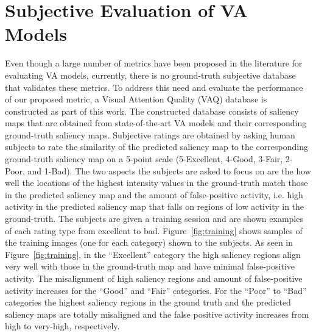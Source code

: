 \documentclass[12pt,onecolumn,journal,	draftclsnofoot]{IEEEtran}
\begin{document}
\section{Subjective Evaluation of VA Models}
\label{sec:subjectivestudy}
Even though a large number of metrics have been proposed in the literature for evaluating VA models, currently, there is no ground-truth subjective database that validates these metrics.  To address this need and evaluate the performance of our proposed metric,  a Visual Attention Quality (VAQ) database is constructed as part of this work.  The constructed database consists of saliency maps that are obtained from state-of-the-art VA models  and their corresponding ground-truth saliency maps.  Subjective ratings are obtained by asking human subjects to rate the similarity of the predicted saliency map to the corresponding ground-truth saliency map on a 5-point scale (5-Excellent, 4-Good, 3-Fair, 2-Poor, and 1-Bad). The two aspects the subjects are asked to focus on are the how well the locations of the highest intensity values in the ground-truth match those in the predicted saliency map and the amount of false-positive activity, i.e. high activity in the predicted saliency map that falls on regions of low activity in the ground-truth. The subjects are given a training session and are shown examples of each rating type from excellent to bad. Figure~\ref{fig:training} shows samples of the training images (one for each category) shown to the subjects. As seen in Figure~\ref{fig:training}, in the ``Excellent'' category the high saliency regions align very well with those in the ground-truth map and have minimal false-positive activity. The misalignment of high saliency regions and amount of false-positive activity increases for the ``Good'' and ``Fair'' categories. For the ``Poor'' to ``Bad'' categories the highest saliency regions in the ground truth and the predicted saliency maps are totally misaligned and the false positive activity increases from high to very-high, respectively.  
\end{document}
